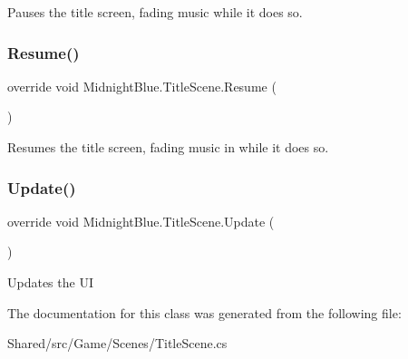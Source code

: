 Pauses the title screen, fading music while it does so. 

\hypertarget{class_midnight_blue_1_1_title_scene_afb0bb3ad8b2766b5d57537dc1ef22249}{}\label{class_midnight_blue_1_1_title_scene_afb0bb3ad8b2766b5d57537dc1ef22249} 
\subsubsection{\texorpdfstring{Resume()}{Resume()}}
{\footnotesize\ttfamily override void Midnight\+Blue.\+Title\+Scene.\+Resume (\begin{DoxyParamCaption}{ }\end{DoxyParamCaption})\hspace{0.3cm}{\ttfamily [inline]}}



Resumes the title screen, fading music in while it does so. 

\hypertarget{class_midnight_blue_1_1_title_scene_a4052b2a261434462cd0150e2f4da3c5b}{}\label{class_midnight_blue_1_1_title_scene_a4052b2a261434462cd0150e2f4da3c5b} 
\subsubsection{\texorpdfstring{Update()}{Update()}}
{\footnotesize\ttfamily override void Midnight\+Blue.\+Title\+Scene.\+Update (\begin{DoxyParamCaption}{ }\end{DoxyParamCaption})\hspace{0.3cm}{\ttfamily [inline]}}



Updates the UI 



The documentation for this class was generated from the following file\+:\begin{DoxyCompactItemize}
\item 
Shared/src/\+Game/\+Scenes/Title\+Scene.\+cs\end{DoxyCompactItemize}
